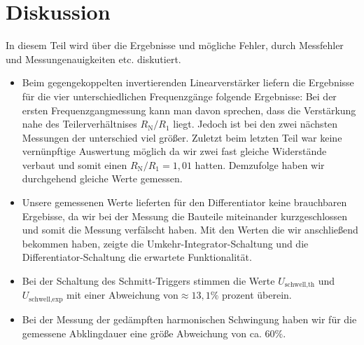 \documentclass{scrartcl}
\begin{document}
\section{Diskussion}
\label{sec:Diskussion}
In diesem Teil wird über die Ergebnisse und mögliche Fehler, durch Messfehler und Messungenauigkeiten etc. diskutiert.
\begin{itemize}
\item Beim gegengekoppelten invertierenden Linearverstärker liefern die Ergebnisse für die vier unterschiedlichen Frequenzgänge folgende Ergebnisse: Bei der ersten Frequenzgangmessung kann man davon sprechen, dass die Verstärkung nahe des Teilerverhältnises $R_\text{N}/R_1$ liegt. Jedoch ist bei den zwei nächsten Messungen der unterschied viel größer. Zuletzt beim letzten Teil war keine vernünpftige Auswertung möglich da wir zwei fast gleiche Widerstände verbaut und somit einen $R_\text{N}/R_1= 1,01$ hatten. Demzufolge haben wir durchgehend gleiche Werte gemessen.
\item Unsere gemessenen Werte lieferten für den Differentiator keine brauchbaren Ergebisse, da wir bei der Messung die Bauteile miteinander kurzgeschlossen und somit die Messung verfälscht haben. Mit den Werten die wir anschließend bekommen haben, zeigte die Umkehr-Integrator-Schaltung und die Differentiator-Schaltung die erwartete Funktionalität.
\item Bei der Schaltung des Schmitt-Triggers stimmen die Werte $U_\text{schwell,th}$ und $U_\text{schwell,exp}$ mit einer Abweichung von$≈13,1\%$ prozent überein.
\item Bei der Messung der gedämpften harmonischen Schwingung haben wir für die gemessene Abklingdauer eine größe Abweichung von ca. $ 60\%$.
\end{itemize}
\fi
\end{document}
